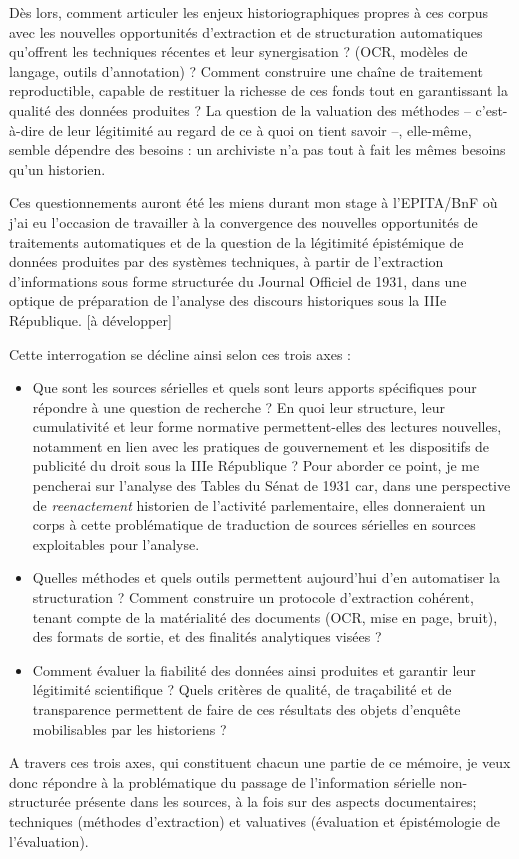 Dès lors, comment articuler les enjeux historiographiques propres à ces corpus avec les nouvelles opportunités d’extraction et de structuration automatiques qu’offrent les techniques récentes et leur synergisation ? (OCR, modèles de langage, outils d’annotation) ? Comment construire une chaîne de traitement reproductible, capable de restituer la richesse de ces fonds tout en garantissant la qualité des données produites ? La question de la valuation des méthodes -- c'est-à-dire de leur légitimité au regard de ce à quoi on tient savoir --, elle-même, semble dépendre des besoins : un archiviste n'a pas tout à fait les mêmes besoins qu'un historien.



Ces questionnements auront été les miens durant mon stage à l'EPITA/BnF où j'ai eu l'occasion de travailler à la convergence des nouvelles opportunités de traitements automatiques et de la question de la légitimité épistémique de données produites par des systèmes techniques, à partir de l'extraction d'informations sous forme structurée du Journal Officiel de 1931, dans une optique de préparation de l'analyse des discours historiques sous la IIIe République. [à développer] 

Cette interrogation se décline ainsi selon ces trois axes :

\begin{itemize}
	\item Que sont les sources sérielles et quels sont leurs apports spécifiques pour répondre à une question de recherche ? En quoi leur structure, leur cumulativité et leur forme normative permettent-elles des lectures nouvelles, notamment en lien avec les pratiques de gouvernement et les dispositifs de publicité du droit sous la IIIe République ? Pour aborder ce point, je me pencherai sur l'analyse des Tables du Sénat de 1931 car, dans une perspective de \textit{reenactement} historien de l'activité parlementaire, elles donneraient un corps à cette problématique de traduction de sources sérielles en sources exploitables pour l'analyse.
	\item Quelles méthodes et quels outils permettent aujourd’hui d’en automatiser la structuration ? Comment construire un protocole d’extraction cohérent, tenant compte de la matérialité des documents (OCR, mise en page, bruit), des formats de sortie, et des finalités analytiques visées ?
	\item Comment évaluer la fiabilité des données ainsi produites et garantir leur légitimité scientifique ? Quels critères de qualité, de traçabilité et de transparence permettent de faire de ces résultats des objets d’enquête mobilisables par les historiens ?
\end{itemize}

A travers ces trois axes, qui constituent chacun une partie de ce mémoire, je veux donc répondre à la problématique du passage de l'information sérielle non-structurée présente dans les sources, à la fois sur des aspects documentaires; techniques (méthodes d'extraction) et valuatives (évaluation et épistémologie de l'évaluation).

